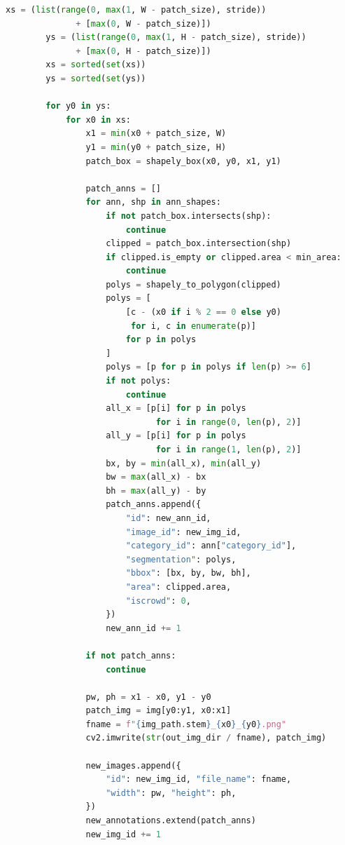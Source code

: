 \documentclass[14pt,a4paper]{extreport}
\begin{document}
\begin{lstlisting}[language=Python]
        xs = (list(range(0, max(1, W - patch_size), stride))
              + [max(0, W - patch_size)])
        ys = (list(range(0, max(1, H - patch_size), stride))
              + [max(0, H - patch_size)])
        xs = sorted(set(xs))
        ys = sorted(set(ys))

        for y0 in ys:
            for x0 in xs:
                x1 = min(x0 + patch_size, W)
                y1 = min(y0 + patch_size, H)
                patch_box = shapely_box(x0, y0, x1, y1)

                patch_anns = []
                for ann, shp in ann_shapes:
                    if not patch_box.intersects(shp):
                        continue
                    clipped = patch_box.intersection(shp)
                    if clipped.is_empty or clipped.area < min_area:
                        continue
                    polys = shapely_to_polygon(clipped)
                    polys = [
                        [c - (x0 if i % 2 == 0 else y0)
                         for i, c in enumerate(p)]
                        for p in polys
                    ]
                    polys = [p for p in polys if len(p) >= 6]
                    if not polys:
                        continue
                    all_x = [p[i] for p in polys
                              for i in range(0, len(p), 2)]
                    all_y = [p[i] for p in polys
                              for i in range(1, len(p), 2)]
                    bx, by = min(all_x), min(all_y)
                    bw = max(all_x) - bx
                    bh = max(all_y) - by
                    patch_anns.append({
                        "id": new_ann_id,
                        "image_id": new_img_id,
                        "category_id": ann["category_id"],
                        "segmentation": polys,
                        "bbox": [bx, by, bw, bh],
                        "area": clipped.area,
                        "iscrowd": 0,
                    })
                    new_ann_id += 1

                if not patch_anns:
                    continue

                pw, ph = x1 - x0, y1 - y0
                patch_img = img[y0:y1, x0:x1]
                fname = f"{img_path.stem}_{x0}_{y0}.png"
                cv2.imwrite(str(out_img_dir / fname), patch_img)

                new_images.append({
                    "id": new_img_id, "file_name": fname,
                    "width": pw, "height": ph,
                })
                new_annotations.extend(patch_anns)
                new_img_id += 1


\end{lstlisting}
\end{document}
